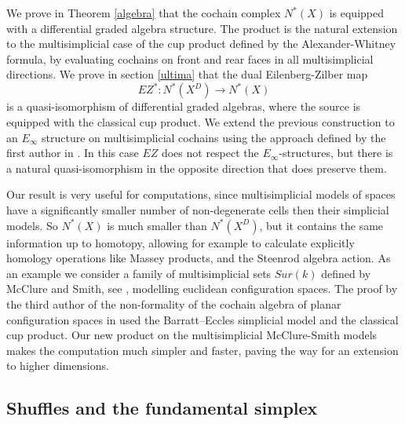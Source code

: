 
\medskip

We prove in Theorem \ref{algebra} %
that the cochain complex $N^*(X)$ is equipped with a differential graded algebra structure.
The product is the natural extension to the multisimplicial case of the cup product defined by the Alexander-Whitney formula, by
evaluating cochains on front and rear faces in all multisimplicial directions.
We prove in section \ref{ultima} that the dual Eilenberg-Zilber map
$$EZ^*:N^*(X^D) \to N^*(X)$$ %
is a quasi-isomorphism of differential graded algebras, where the source is equipped with the classical cup product.
We extend the previous construction to an $E_\infty$ structure on multisimplicial cochains using the approach defined by the first author in \cite{anibal}.
In this case $EZ$ does not respect the $E_\infty$-structures, but there is a natural quasi-isomorphism in the opposite direction that does preserve them.

Our result is very useful for computations, since multisimplicial models of spaces have a significantly smaller number of non-degenerate cells then their simplicial models.
So $N^*(X)$ is much smaller than $N^*(X^D)$, but it contains the same information up to homotopy, allowing for example to calculate explicitly homology operations like Massey products, and the Steenrod algebra action.
As an example we consider a family of multisimplicial sets $Sur(k)$ defined by McClure and Smith, see \cite{MS}, modelling euclidean configuration spaces.
The proof by the third author of the non-formality of the cochain algebra of planar configuration spaces in \cite{formality} used the Barratt--Eccles simplicial model and the classical cup product.
Our new product on the multisimplicial McClure-Smith models makes the computation much simpler and faster, paving the way for an extension to higher dimensions.


\subsection{Shuffles and the fundamental simplex} \label{ss:shuffles and fundamental simplex}

